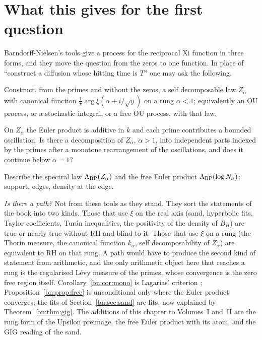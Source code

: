 \section{What this gives for the first question}\label{bn:sec:path}
Barndorff-Nielsen's tools give a process for the reciprocal Xi function in three forms, and they move the question from the zeros to one function. In place of ``construct a diffusion whose hitting time is $T$'' one may ask the following.
\begin{problem}\label{bn:prob:one}
Construct, from the primes and without the zeros, a self decomposable law $Z_\alpha$ with canonical function $\frac1\pi\arg\xi(\alpha+i/\sqrt y)$ on a rung $\alpha<1$; equivalently an OU process, or a stochastic integral, or a free OU process, with that law.
\end{problem}
\begin{problem}\label{bn:prob:two}
On $Z_\alpha$ the Euler product is additive in $k$ and each prime contributes a bounded oscillation. Is there a decomposition of $Z_\alpha$, $\alpha>1$, into independent parts indexed by the primes after a monotone rearrangement of the oscillations, and does it continue below $\alpha=1$?
\end{problem}
\begin{problem}\label{bn:prob:three}
Describe the spectral law $\Lambda_{\rm BP}(Z_\alpha)$ and the free Euler product $\Lambda_{\rm BP}(\log N_\sigma)$: support, edges, density at the edge.
\end{problem}
\medskip\noindent\textit{Is there a path?} Not from these tools as they stand. They sort the statements of the book into two kinds. Those that use $\xi$ on the real axis (sand, hyperbolic fits, Taylor coefficients, Tur\'an inequalities, the positivity of the density of $B_H$) are true or nearly true without RH and blind to it. Those that use $\xi$ on a rung (the Thorin measure, the canonical function $k_\alpha$, self decomposability of $Z_\alpha$) are equivalent to RH on that rung. A path would have to produce the second kind of statement from arithmetic, and the only arithmetic object here that reaches a rung is the regularised L\'evy measure of the primes, whose convergence is the zero free region itself. Corollary~\ref{bn:cor:mono} is Lagarias' criterion \cite{Lagarias}; Proposition~\ref{bn:prop:free} is unconditional only where the Euler product converges; the fits of Section~\ref{bn:sec:sand} are fits, now explained by Theorem~\ref{bn:thm:gig}. The additions of this chapter to Volumes~I and~II are the rung form of the Upsilon preimage, the free Euler product with its atom, and the GIG reading of the sand.
